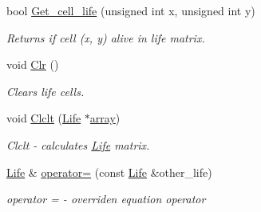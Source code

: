 \begin{DoxyCompactItemize}
bool \mbox{\hyperlink{class_life_a9e4be3de8f40459707402d2744eaac90}{Get\+\_\+cell\+\_\+life}} (unsigned int x, unsigned int y)
\begin{DoxyCompactList}\small\item\em Returns if cell (x, y) alive in life matrix. \end{DoxyCompactList}\item 
void \mbox{\hyperlink{class_life_a7ec128155eec1c792ca8c529f2b3a44d}{Clr}} ()
\begin{DoxyCompactList}\small\item\em Clears life cells. \end{DoxyCompactList}\item 
void \mbox{\hyperlink{class_life_a64d3039888e089796f81926ef13324d1}{Clclt}} (\mbox{\hyperlink{class_life}{Life}} $\ast$\mbox{\hyperlink{class_life_a4fa70771b707df0c393642c512f53330}{array}})
\begin{DoxyCompactList}\small\item\em Clclt -\/ calculates \mbox{\hyperlink{class_life}{Life}} matrix. \end{DoxyCompactList}\item 
\mbox{\hyperlink{class_life}{Life}} \& \mbox{\hyperlink{class_life_a4266d1150f2cd98e9f720705c64da32e}{operator=}} (const \mbox{\hyperlink{class_life}{Life}} \&other\+\_\+life)
\begin{DoxyCompactList}\small\item\em operator = -\/ overriden equation operator \end{DoxyCompactList}\end{DoxyCompactItemize}
